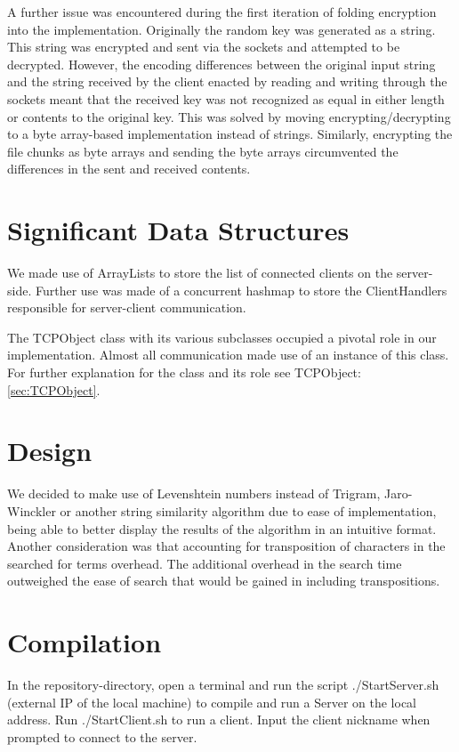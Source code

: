 \documentclass[12pt, a4paper]{article}
\begin{document}
A further issue was encountered during the first iteration of folding encryption into the implementation. Originally the random key was generated as a string. This string was encrypted and sent via the sockets and attempted to be decrypted. However, the encoding differences between the original input string and the string received by the client enacted by reading and writing through the sockets meant that the received key was not recognized as equal in either length or contents to the original key. This was solved by moving encrypting/decrypting to a byte array-based implementation instead of strings. Similarly, encrypting the file chunks as byte arrays and sending the byte arrays circumvented the differences in the sent and received contents.

\section{Significant Data Structures}
We made use of ArrayLists to store the list of connected clients on the server-side.
Further use was made of a concurrent hashmap to store the ClientHandlers responsible for server-client communication.

The TCPObject class with its various subclasses occupied a pivotal role in our implementation. Almost all communication made use of an instance of this class. For further explanation for the class and its role see TCPObject: \ref{sec:TCPObject}.

\section{Design}
We decided to make use of Levenshtein numbers instead of Trigram, Jaro-Winckler or another string similarity algorithm due to ease of implementation, being able to better display the results of the algorithm in an intuitive format. Another consideration was that accounting for transposition of characters in the searched for terms overhead. The additional overhead in the search time outweighed the ease of search that would be gained in including transpositions.


\section{Compilation}
In the repository-directory, open a terminal and run the script ./StartServer.sh (external IP of the local machine) to compile and run a Server on the local address. Run ./StartClient.sh to run a client. Input the client nickname when prompted to connect to the server.
\end{document}
